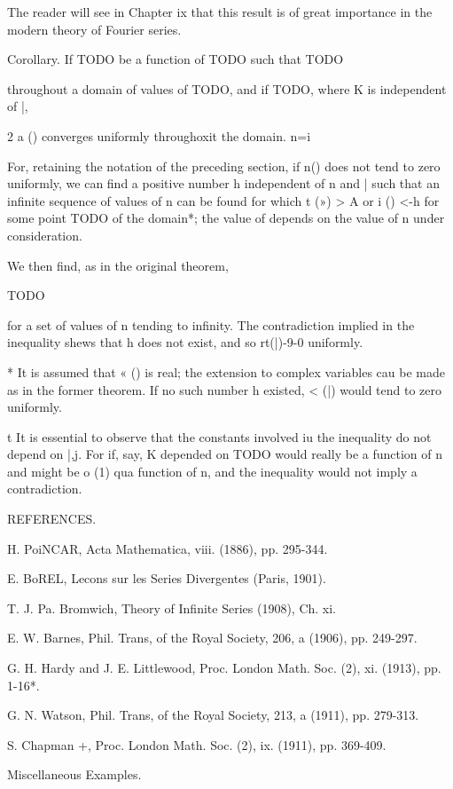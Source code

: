 The reader will see in Chapter ix that this result is of great
importance in the modern theory of Fourier series.

Corollary. If TODO be a function of TODO such that TODO

throughout a domain of values of TODO, and if TODO, where K is
independent of |,

2 a () converges uniformly throughoxit the domain. n=i

For, retaining the notation of the preceding section, if n() does
not tend to zero uniformly, we can find a positive number h
independent of n and | such that an infinite sequence of values of n
can be found for which t (») > A or i () <-h for some point
TODO of the domain*; the value of  depends on the value of n under
consideration.

We then find, as in the original theorem,

TODO

for a set of values of n tending to infinity. The contradiction
implied in the inequality shews that h does not exist, and so
rt(|)-9-0 uniformly.

* It is assumed that « () is real; the extension to complex
variables cau be made as in the former theorem. If no such number h
existed, < (|) would tend to zero uniformly.

t It is essential to observe that the constants involved iu the
inequality do not depend on |,j. For if, say, K depended on TODO
would really be a function of n and might be o (1) qua function of n,
and the inequality would not imply a contradiction.

%
%

REFERENCES.

H. PoiNCAR, Acta Mathematica, viii. (1886), pp. 295-344.

E. BoREL, Lecons sur les Series Divergentes (Paris, 1901).

T. J. Pa. Bromwich, Theory of Infinite Series (1908), Ch. xi.

E. W. Barnes, Phil. Trans, of the Royal Society, 206, a (1906), pp.
249-297.

G. H. Hardy and J. E. Littlewood, Proc. London Math. Soc. (2), xi.
(1913), pp. 1-16*.

G. N. Watson, Phil. Trans, of the Royal Society, 213, a (1911), pp.
279-313.

S. Chapman +, Proc. London Math. Soc. (2), ix. (1911), pp. 369-409.

Miscellaneous Examples.

